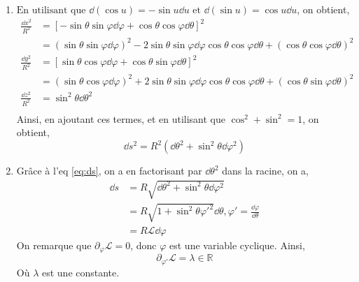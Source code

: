 \documentclass[a4paper,10pt]{report}
\begin{document}
	\begin{enumerate}
		\item $\text{En utilisant que } \dd (\cos u) = -\sin u \dd u \text { et } \dd (\sin u) = \cos u \dd u$, on obtient, \begin{align*}
			\frac {\dd x^2}{R^2} &= [-\sin \theta \sin \varphi \dd\varphi + \cos \theta \cos \varphi \dd\theta]^2\\
			 &= (\sin \theta \sin \varphi \dd\varphi)^2 - 2\sin \theta \sin \varphi \dd\varphi \cos \theta \cos \varphi \dd\theta + (\cos \theta \cos \varphi \dd\theta)^2\\
			\frac {\dd y^2}{R^2} &= [\sin \theta \cos \varphi \dd\varphi + \cos \theta \sin \varphi \dd\theta]^2 \\
			&= (\sin \theta \cos \varphi \dd\varphi)^2 + 2\sin \theta \sin \varphi \dd\varphi \cos \theta \cos \varphi \dd\theta +  (\cos \theta \sin \varphi \dd\theta)^2\\
			\frac {\dd z^2}{R^2} &= \sin^2 \theta \dd \theta^2\\
		\end{align*}
		Ainsi, en ajoutant ces termes, et en utilisant que $\cos^2 + \sin^2 = 1$, on obtient,
		\begin{equation}
			\dd s^2 = R^2(\dd \theta^2 + \sin^2 \theta \dd \varphi^2) \label{eq:ds} \tag{3.5.1}
		\end{equation}
	\item Grâce à l'eq \ref{eq:ds}, on a en factorisant par $\dd \theta^2$ dans la racine, on a,
	\begin{align*}
		\dd s &= R\sqrt{\dd \theta^2 + \sin^2 \theta \dd \varphi^2}\\
		&= R \sqrt{1 + \sin^2 \theta \varphi'^2}\dd \theta, \varphi' = \frac{\dd \varphi}{\dd \theta}\\
		&= R \mathcal L \dd \varphi
	\end{align*}
	On remarque que $\partial_\varphi \mathcal L = 0$, donc $\varphi$ est une variable cyclique.
	Ainsi, $$\partial_{\varphi'} \mathcal L = \lambda \in \mathbb{R}$$
	Où $\lambda$ est une constante.
	

\end{enumerate}
\end{document}
